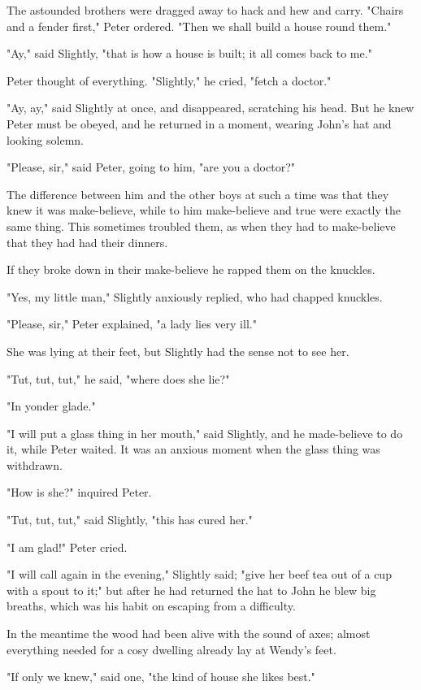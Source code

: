 The astounded brothers were dragged away to hack and hew and carry.
"Chairs and a fender first," Peter ordered. "Then we shall
build a house round them."


"Ay," said Slightly, "that is how a house is built; it all comes back to
me."


Peter thought of everything. "Slightly," he cried, "fetch a doctor."


"Ay, ay," said Slightly at once, and disappeared, scratching his head. But
he knew Peter must be obeyed, and he returned in a moment, wearing John's
hat and looking solemn.


"Please, sir," said Peter, going to him, "are you a doctor?"


The difference between him and the other boys at such a time was that they
knew it was make-believe, while to him make-believe and true were exactly
the same thing. This sometimes troubled them, as when they had to
make-believe that they had had their dinners.


If they broke down in their make-believe he rapped them on the knuckles.


"Yes, my little man," Slightly anxiously replied, who had chapped
knuckles.


"Please, sir," Peter explained, "a lady lies very ill."


She was lying at their feet, but Slightly had the sense not to see her.


"Tut, tut, tut," he said, "where does she lie?"


"In yonder glade."


"I will put a glass thing in her mouth," said Slightly, and he
made-believe to do it, while Peter waited. It was an anxious moment when
the glass thing was withdrawn.


"How is she?" inquired Peter.


"Tut, tut, tut," said Slightly, "this has cured her."


"I am glad!" Peter cried.


"I will call again in the evening," Slightly said; "give her beef tea out
of a cup with a spout to it;" but after he had returned the hat to John he
blew big breaths, which was his habit on escaping from a difficulty.


In the meantime the wood had been alive with the sound of axes; almost
everything needed for a cosy dwelling already lay at Wendy's feet.


"If only we knew," said one, "the kind of house she likes best."


